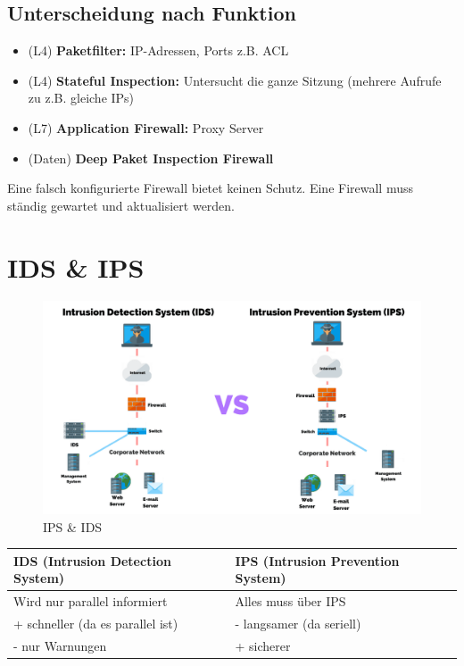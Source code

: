 \subsection*{Unterscheidung nach Funktion}
\begin{itemize}
	\item (L4) \textbf{Paketfilter:} IP-Adressen, Ports z.B. ACL
	\item (L4) \textbf{Stateful Inspection:} Untersucht die ganze Sitzung (mehrere Aufrufe zu z.B. gleiche IPs)
	\item (L7) \textbf{Application Firewall:} Proxy Server
	\item (Daten) \textbf{Deep Paket Inspection Firewall}
\end{itemize}

Eine falsch konfigurierte Firewall bietet keinen Schutz. Eine Firewall muss ständig gewartet und aktualisiert werden.

\section{IDS \& IPS}
\begin{figure}[H]
	\centering
	\includegraphics[width=0.8\linewidth]{figures/ids_ips.png}
	\caption{IPS \& IDS}
\end{figure}

\begin{tabular}{ | p{} | p{} |} \hline
	\textbf{IDS (Intrusion Detection System)} & \textbf{IPS (Intrusion Prevention System)} \\ \hline
	Wird nur parallel informiert & Alles muss über IPS \\
	+ schneller (da es parallel ist) & - langsamer (da seriell) \\
	- nur Warnungen & + sicherer \\
	\hline
\end{tabular} 

